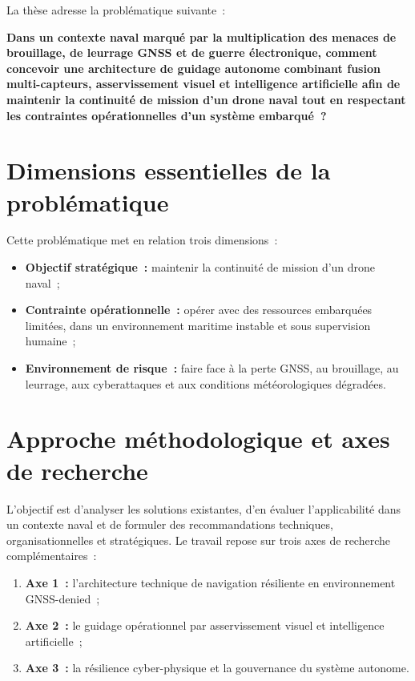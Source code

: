 \documentclass[12pt, a4paper, twoside, openright]{report}
\begin{document}
La thèse adresse la problématique suivante~:

\begin{mdframed}[backgroundcolor=gray!10, linewidth=2pt]
\textbf{Dans un contexte naval marqué par la multiplication des menaces de brouillage, de leurrage GNSS et de guerre électronique, comment concevoir une architecture de guidage autonome combinant fusion multi-capteurs, asservissement visuel et intelligence artificielle afin de maintenir la continuité de mission d'un drone naval tout en respectant les contraintes opérationnelles d'un système embarqué~?}
\end{mdframed}

\section{Dimensions essentielles de la problématique}

Cette problématique met en relation trois dimensions~:

\begin{itemize}
    \item \textbf{Objectif stratégique~:} maintenir la continuité de mission d'un drone naval~;
    \item \textbf{Contrainte opérationnelle~:} opérer avec des ressources embarquées limitées, dans un environnement maritime instable et sous supervision humaine~;
    \item \textbf{Environnement de risque~:} faire face à la perte GNSS, au brouillage, au leurrage, aux cyberattaques et aux conditions météorologiques dégradées.
\end{itemize}

\section{Approche méthodologique et axes de recherche}

L'objectif est d'analyser les solutions existantes, d'en évaluer l'applicabilité dans un contexte naval et de formuler des recommandations techniques, organisationnelles et stratégiques. Le travail repose sur trois axes de recherche complémentaires~:

\begin{enumerate}
    \item \textbf{Axe 1~:} l'architecture technique de navigation résiliente en environnement GNSS-denied~;
    \item \textbf{Axe 2~:} le guidage opérationnel par asservissement visuel et intelligence artificielle~;
    \item \textbf{Axe 3~:} la résilience cyber-physique et la gouvernance du système autonome.
\end{enumerate}
\end{document}
